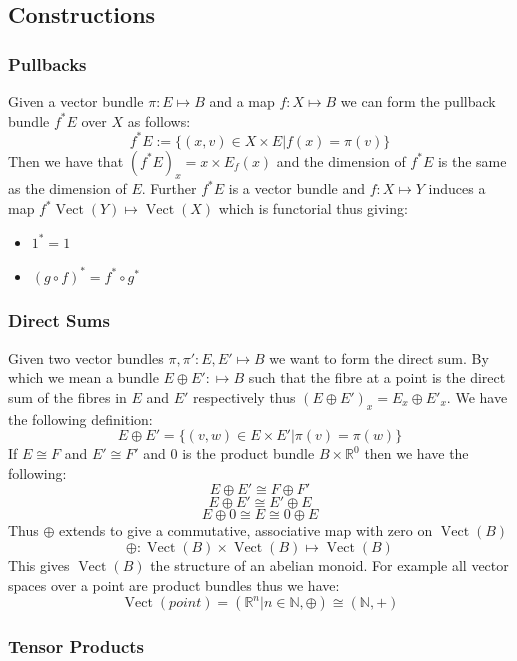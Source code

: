 \documentclass[a4paper,10pt]{article}
\theoremstyle{plain}%
\theoremstyle{definition}
\theoremstyle{remark}
\newcommand{\NN}{\mathbb{N}}
\newcommand{\RR}{\mathbb{R}}
\DeclareMathOperator{\Vect}{Vect}
\begin{document}
\subsection{Constructions}

\subsubsection{Pullbacks}

Given a vector bundle $\pi:E\mapsto B$ and a map $f:X\mapsto B$ we can form the pullback bundle
$f^\ast E$ over $X$ as follows:
$$f^\ast E := \{ (x,v) \in X\times E | f(x)=\pi(v)\}$$
Then we have that $(f^\ast E)_x=x\times E_f(x)$ and the dimension of $f^\ast E$ is the same as
the dimension of $E$. Further $f^\ast E$ is a vector bundle and $f:X\mapsto Y$ induces a map
$f^\ast \Vect(Y)\mapsto \Vect(X)$ which is functorial thus giving:
\begin{itemize}
 \item $1^\ast = 1$
 \item $(g\circ f)^\ast = f^\ast \circ g^\ast$
\end{itemize}


\subsubsection{Direct Sums}

Given two vector bundles $\pi,\pi':E,E'\mapsto B$ we want to form the direct sum. By which we mean a bundle 
$E\oplus E':\mapsto B$ such that the fibre at a point is the direct sum of the fibres in $E$
and $E'$ respectively thus $(E\oplus E')_x=E_x\oplus E'_x$. We have the following definition:
$$E\oplus E' = \{(v,w)\in E\times E' | \pi(v)=\pi(w) \}$$
If $E\cong F$ and $E'\cong F'$ and $0$ is the product bundle $B\times \RR^0$ then we have the following:
$$ E\oplus E'\cong F\oplus F'$$
$$ E\oplus E'\cong E'\oplus E$$
$$ E\oplus 0\cong E \cong 0\oplus E$$
Thus $\oplus$ extends to give a commutative, associative map with zero on $\Vect(B)$
$$\oplus :\Vect(B)\times \Vect(B)\mapsto \Vect(B)$$
This gives $\Vect(B)$ the structure of an abelian monoid. For example all vector spaces over a point
are product bundles thus we have:
$$\Vect(point)=({\RR^n|n\in\NN},\oplus)\cong (\NN,+)$$

\subsubsection{Tensor Products}
\end{document}
